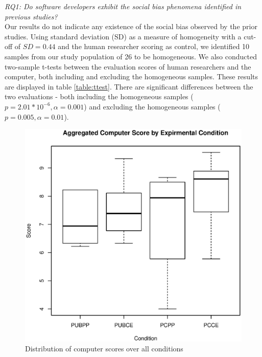 \documentclass{sig-alternate-05-2015}
\begin{document}
\textit{RQ1: Do software developers exhibit the social bias phenomena identified in previous studies?}\\
Our results do not indicate any existence of the social bias observed by the prior studies. Using standard deviation (SD) as a measure of homogeneity with a cut-off of $SD=0.44$ and the human researcher scoring as control, we identified 10 samples from our study population of 26 to be homogeneous. We also conducted two-sample t-tests between the evaluation scores of human researchers and the computer, both including and excluding the homogeneous samples. These results are displayed in table \ref{table:ttest}. There are significant differences between the two evaluations - both including the homogeneous samples ($p=2.01*10^{-6}, \alpha=0.001$) and excluding the homogeneous samples ($p=0.005, \alpha=0.01$).

\begin{figure}[h!]
\includegraphics[width=\columnwidth]{compBoxPlot}
\centering
\caption{Distribution of computer scores over all conditions}
\label{fig:compBoxPlot}
\end{figure}
\end{document}

